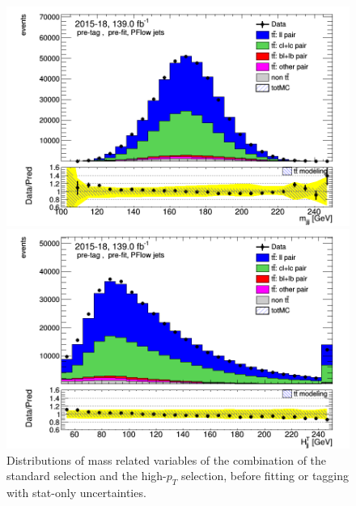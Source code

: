 \documentclass[letterpaper,12pt]{article}
\begin{document}
\begin{figure}
\begin{minipage}[b]{.45\textwidth}
	\centering
	\includegraphics[width=1\textwidth]{Oct_distributions/pretagNoRwDL1rwithhighpTPFlow_scaledall/DataMC_mjjj.png}
	\end{minipage}\hfill
	\begin{minipage}[b]{.45\textwidth}
	\centering
	\includegraphics[width=1\textwidth]{Oct_distributions/pretagNoRwDL1rwithhighpTPFlow_scaledall/DataMC_Htjj.png}
	\end{minipage}\hfill
	\caption{Distributions of mass related variables of the combination 
	of the standard selection and the 
	high-$p_T$ selection, before fitting or 
	tagging with stat-only uncertainties.} \label{fig:mass_PFlow}
	\end{figure}
	
	
	
\end{document}
